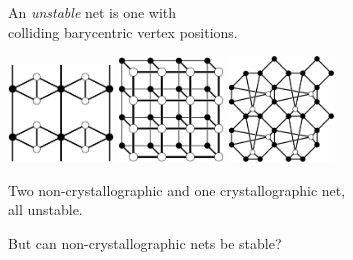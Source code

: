 \documentclass{beamer}
\begin{document}
\begin{frame}
  \begin{center}
    An {\em unstable} net is one with\\
    colliding barycentric vertex positions.

    \includegraphics[width=1.1in]{unstable}
    \quad
    \includegraphics[width=1.1in]{ladder}
    \quad
    \includegraphics[width=1.1in]{collision}

    Two non-crystallographic and one crystallographic net,\\
    all unstable.

    But can non-crystallographic nets be stable?
  \end{center}
\end{frame}
\end{document}
